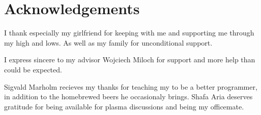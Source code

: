 \section*{Acknowledgements}
	I thank especially my girlfriend for keeping with me and supporting me through my high and lows.
	As well as my family for unconditional support.

	I express sincere to my advisor Wojciech Miloch for support and more help than could be expected.

	Sigvald Marholm recieves my thanks for teaching my to be a better programmer, in addition
	to the homebrewed beers he occasionaly brings. Shafa Aria deserves gratitude for being available
	for plasma discussions and being my officemate.

